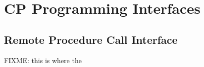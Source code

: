 \chapter*{CP Programming Interfaces}
\section*{Remote Procedure Call Interface}
FIXME: this is where the 
